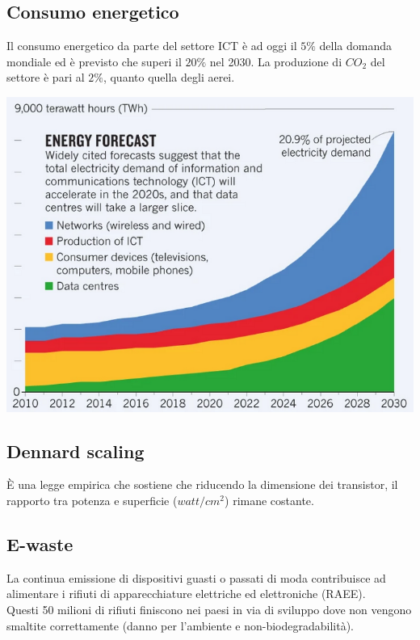 \newpage
\subsection{Consumo energetico}
Il consumo energetico da parte del settore ICT è ad oggi il $5\%$ della domanda mondiale ed è previsto che superi il $20\%$ nel 2030. La produzione di $CO_2$ del settore è pari al $2\%$, quanto quella degli aerei.
\begin{center}
	\includegraphics[scale=0.3]{energy_consumption.png}
\end{center}

\subsection{Dennard scaling}
È una legge empirica che sostiene che riducendo la dimensione dei transistor, il rapporto tra potenza e superficie ($watt/cm^2$) rimane costante.


\subsection{E-waste}
La continua emissione di dispositivi guasti o passati di moda contribuisce ad alimentare i rifiuti di apparecchiature elettriche ed elettroniche (RAEE). \\
Questi 50 milioni di rifiuti finiscono nei paesi in via di sviluppo dove non vengono smaltite correttamente (danno per l'ambiente e non-biodegradabilità).

